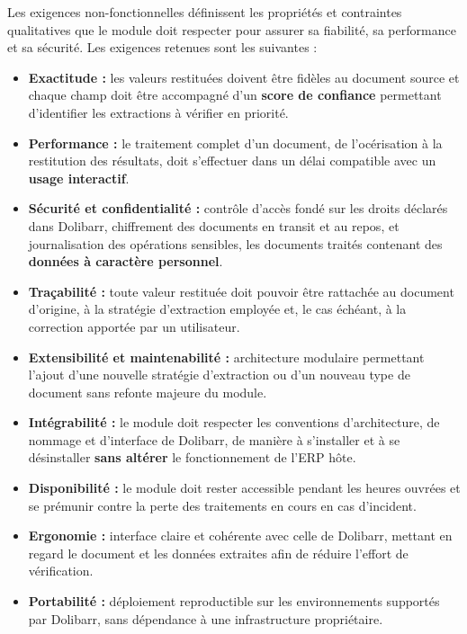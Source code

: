 Les exigences non-fonctionnelles définissent les propriétés et contraintes qualitatives que le
module doit respecter pour assurer sa fiabilité, sa performance et sa sécurité. Les exigences
retenues sont les suivantes :

\begin{itemize}
    \item[\opmanicule] \textbf{Exactitude :} les valeurs restituées doivent être fidèles au
    document source et chaque champ doit être accompagné d'un \textbf{score de confiance}
    permettant d'identifier les extractions à vérifier en priorité.

    \item[\opmanicule] \textbf{Performance :} le traitement complet d'un document, de
    l'océrisation à la restitution des résultats, doit s'effectuer dans un délai compatible
    avec un \textbf{usage interactif}.

    \item[\opmanicule] \textbf{Sécurité et confidentialité :} contrôle d'accès fondé sur les
    droits déclarés dans Dolibarr, chiffrement des documents en transit et au repos, et
    journalisation des opérations sensibles, les documents traités contenant des
    \textbf{données à caractère personnel}.

    \item[\opmanicule] \textbf{Traçabilité :} toute valeur restituée doit pouvoir être
    rattachée au document d'origine, à la stratégie d'extraction employée et, le cas échéant,
    à la correction apportée par un utilisateur.

    \item[\opmanicule] \textbf{Extensibilité et maintenabilité :} architecture modulaire
    permettant l'ajout d'une nouvelle stratégie d'extraction ou d'un nouveau type de document
    sans refonte majeure du module.

    \item[\opmanicule] \textbf{Intégrabilité :} le module doit respecter les conventions
    d'architecture, de nommage et d'interface de Dolibarr, de manière à s'installer et à se
    désinstaller \textbf{sans altérer} le fonctionnement de l'ERP hôte.

    \item[\opmanicule] \textbf{Disponibilité :} le module doit rester accessible pendant les
    heures ouvrées et se prémunir contre la perte des traitements en cours en cas d'incident.

    \item[\opmanicule] \textbf{Ergonomie :} interface claire et cohérente avec celle de
    Dolibarr, mettant en regard le document et les données extraites afin de réduire l'effort
    de vérification.

    \item[\opmanicule] \textbf{Portabilité :} déploiement reproductible sur les environnements
    supportés par Dolibarr, sans dépendance à une infrastructure propriétaire.
\end{itemize}

